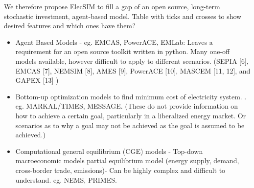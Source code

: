 We therefore propose ElecSIM to fill a gap of an open source, long-term stochastic investment, agent-based model. {\color{red}Table with ticks and crosses to show desired features and which ones have them?}

\begin{itemize}
	\item Agent Based Models - eg. EMCAS, PowerACE, EMLab: Leaves a requirement for an open source toolkit written in python. Many one-off models available, however difficult to apply to different scenarios.
	(SEPIA [6], EMCAS [7], NEMSIM [8], AMES [9], PowerACE [10], MASCEM [11, 12], and GAPEX [13] \cite{Lopes})
	\item Bottom-up optimization models to find minimum cost of electricity system. \cite{Pfenninger2014}. eg. MARKAL/TIMES, MESSAGE. (These do not provide information on how to achieve a certain goal, particularly in a liberalized energy market. Or scenarios as to why a goal may not be achieved as the goal is assumed to be achieved.)
	\item Computational general equilibrium (CGE) models - Top-down macroeconomic models partial equilibrium model (energy supply, demand, cross-border trade, emissions)- Can be highly complex and difficult to understand. eg. NEMS, PRIMES.
\end{itemize}



